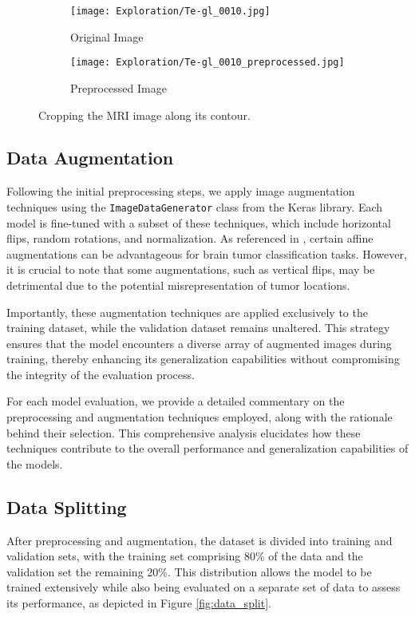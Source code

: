 \begin{figure}[H]
  \centering
  \begin{subfigure}[b]{0.15\textwidth}
    \centering
    \texttt{[image: Exploration/Te-gl\_0010.jpg]}
    \caption{Original Image}
    \label{fig:original_image}
  \end{subfigure}
  \begin{subfigure}[b]{0.15\textwidth}
    \centering
    \texttt{[image: Exploration/Te-gl\_0010\_preprocessed.jpg]}
    \caption{Preprocessed Image}
    \label{fig:preprocessed_image}
  \end{subfigure}
  \caption{Cropping the MRI image along its contour.}\label{fig:image_cropping}
\end{figure}


\subsection{Data Augmentation}\label{data_augmentation}

Following the initial preprocessing steps, we apply image augmentation techniques using the \texttt{ImageDataGenerator} class from the Keras library. Each model is fine-tuned with a subset of these techniques, which include horizontal flips, random rotations, and normalization. As referenced in \cite{nalepa_data_2019}, certain affine augmentations can be advantageous for brain tumor classification tasks. However, it is crucial to note that some augmentations, such as vertical flips, may be detrimental due to the potential misrepresentation of tumor locations.

Importantly, these augmentation techniques are applied exclusively to the training dataset, while the validation dataset remains unaltered. This strategy ensures that the model encounters a diverse array of augmented images during training, thereby enhancing its generalization capabilities without compromising the integrity of the evaluation process.

For each model evaluation, we provide a detailed commentary on the preprocessing and augmentation techniques employed, along with the rationale behind their selection. This comprehensive analysis elucidates how these techniques contribute to the overall performance and generalization capabilities of the models.

\subsection{Data Splitting}\label{data_splitting}
After preprocessing and augmentation, the dataset is divided into training and validation sets, with the training set comprising 80\% of the data and the validation set the remaining 20\%. This distribution allows the model to be trained extensively while also being evaluated on a separate set of data to assess its performance, as depicted in Figure \ref{fig:data_split}.

